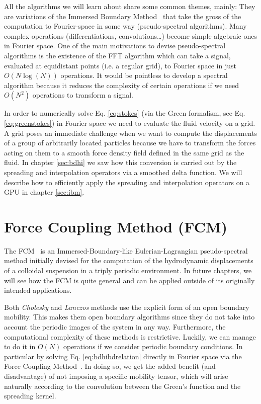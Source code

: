 \documentclass[twoside,openright,titlepage,numbers=noenddot,%
headinclude,footinclude,cleardoublepage=empty,abstract=on,
BCOR=5mm,fontsize=11pt, dvipsnames, paper=b5
]{scrreprt}
\newcommand{\gpu}{\gls{GPU}\xspace}
\begin{document}
All the algorithms we will learn about share some common themes, mainly: They are variations of the Immersed Boundary Method~\cite{Peskin2002} that take the gross of the computation to Fourier-space in some way (pseudo-spectral algorithms). Many complex operations (differentiations, convolutions\dots) become simple algebraic ones in Fourier space. One of the main motivations to devise pseudo-spectral algorithms is the existence of the \gls{FFT} algorithm which can take a signal, evaluated at equidistant points (i.e. a regular grid), to Fourier space in just $O(N\log(N))$ operations. It would be pointless to develop a spectral algorithm because it reduces the complexity of certain operations if we need $O(N^2)$ operations to transform a signal.

In order to numerically solve Eq. \eqref{eq:stokes} (via the Green formalism, see Eq. \eqref{eq:greenstokes}) in Fourier space we need to evaluate the fluid velocity on a grid.
A grid poses an immediate challenge when we want to compute the displacements of a group of arbitrarily located particles because we have to transform the forces acting on them to a smooth force density field defined in the same grid as the fluid. In chapter \ref{sec:bdhi} we saw how this conversion is carried out by the spreading and interpolation operators via a smoothed delta function. We will describe how to efficiently apply the spreading and interpolation operators on a \gpu in chapter \ref{sec:ibm}.



\section{Force Coupling Method (FCM)}\label{sec:fcm}
The \gls{FCM}~\cite{Keaveny2014} is an Immersed-Boundary-like Eulerian-Lagrangian pseudo-spectral method initially devised for the computation of the hydrodynamic displacements of a colloidal suspension in a triply periodic environment. In future chapters, we will see how the \gls{FCM} is quite general and can be applied outside of its originally intended applications.

Both \emph{Cholesky} and \emph{Lanczos} methods use the explicit form of an open boundary mobility. This makes them open boundary algorithms since they do not take into account the periodic images of the system in any way. Furthermore, the computational complexity of these methods is restrictive. Luckily, we can manage to do it in $O(N)$ operations if we consider periodic boundary conditions. In particular by solving Eq. \eqref{eq:bdhibdrelation} directly in Fourier space via the Force Coupling Method~\cite{Keaveny2014}. In doing so, we get the added benefit (and disadvantage) of not imposing a specific mobility tensor, which will arise naturally according to the convolution between the Green's function and the spreading kernel.
\end{document}

